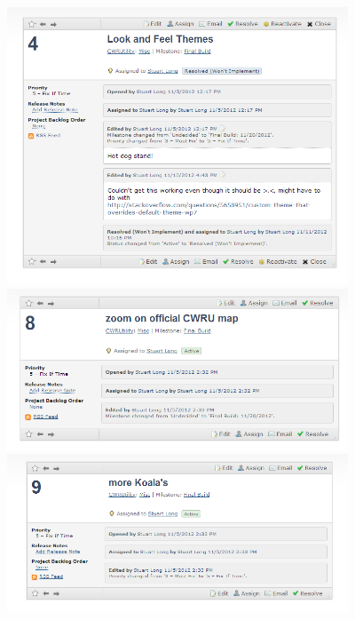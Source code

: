 \documentclass[pdftex,12pt,letter]{article}
\begin{document}
\FloatBarrier
\includegraphics[width=4in]{bugs18.png}
\FloatBarrier
\includegraphics[width=4in]{bugs19.png}
\FloatBarrier
\includegraphics[width=4in]{bugs20.png}
\end{document}
